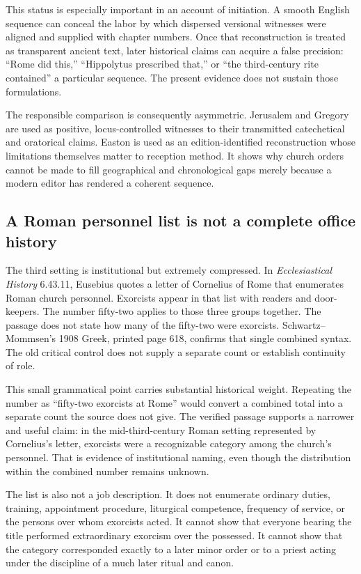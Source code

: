 This status is especially important in an account of initiation. A smooth
English sequence can conceal the labor by which dispersed versional witnesses
were aligned and supplied with chapter numbers. Once that reconstruction is
treated as transparent ancient text, later historical claims can acquire a
false precision: ``Rome did this,'' ``Hippolytus prescribed that,'' or ``the
third-century rite contained'' a particular sequence. The present evidence
does not sustain those formulations.

The responsible comparison is consequently asymmetric. Jerusalem and Gregory
are used as positive, locus-controlled witnesses to their transmitted
catechetical and oratorical claims. Easton is used as an edition-identified
reconstruction whose limitations themselves matter to reception method. It
shows why church orders cannot be made to fill geographical and chronological
gaps merely because a modern editor has rendered a coherent sequence.

\subsection{A Roman personnel list is not a complete office history}

The third setting is institutional but extremely compressed. In
\emph{Ecclesiastical History} 6.43.11, Eusebius quotes a letter of Cornelius of
Rome that enumerates Roman church personnel. Exorcists appear in that list
with readers and door-keepers. The number fifty-two applies to those three
groups together. The passage does not state how many of the fifty-two were
exorcists. Schwartz--Mommsen's 1908 Greek, printed page 618, confirms that
single combined syntax. The old critical control does not supply a separate
count or establish continuity of role.

This small grammatical point carries substantial historical weight. Repeating
the number as ``fifty-two exorcists at Rome'' would convert a combined total
into a separate count the source does not give. The verified passage supports
a narrower and useful claim: in the mid-third-century Roman setting represented
by Cornelius's letter, exorcists were a recognizable category among the
church's personnel. That is evidence of institutional naming, even though the
distribution within the combined number remains unknown.

The list is also not a job description. It does not enumerate ordinary duties,
training, appointment procedure, liturgical competence, frequency of service,
or the persons over whom exorcists acted. It cannot show that everyone bearing
the title performed extraordinary exorcism over the possessed. It cannot show
that the category corresponded exactly to a later minor order or to a priest
acting under the discipline of a much later ritual and canon.

